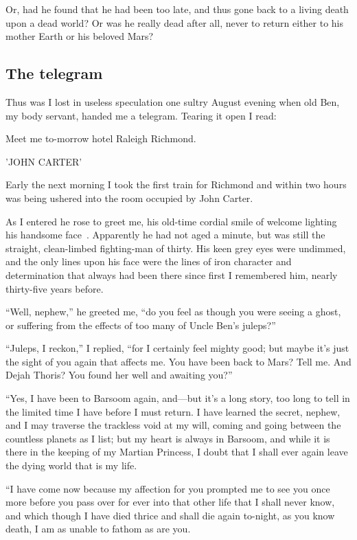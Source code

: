 \documentclass[11pt,a4paper,twocolumn]{article}
\begin{document}
Or, had he found that he had been too late, and thus gone back to a living
death upon a dead world?  Or was he really dead after all, never to return
either to his mother Earth or his beloved Mars?

\subsection{The telegram}

Thus was I lost in useless speculation one sultry August evening when old Ben,
my body servant, handed me a telegram.  Tearing it open I read:

\begin{center}
Meet me to-morrow hotel Raleigh Richmond.

'JOHN CARTER'
\end{center}

Early the next morning I took the first train for Richmond and within two hours
was being ushered into the room occupied by John Carter.

As I entered he rose to greet me, his old-time cordial smile of welcome
lighting his handsome face~\cite{Clarke2000}.  Apparently he had not aged a minute, but was still
the straight, clean-limbed fighting-man of thirty.  His keen grey eyes were
undimmed, and the only lines upon his face were the lines of iron character and
determination that always had been there since first I remembered him, nearly
thirty-five years before.

``Well, nephew,'' he greeted me, ``do you feel as though you were seeing a
ghost, or suffering from the effects of too many of Uncle Ben's juleps?''

``Juleps, I reckon,'' I replied, ``for I certainly feel mighty good; but maybe
it's just the sight of you again that affects me.  You have been back to Mars?
Tell me.  And Dejah Thoris?  You found her well and awaiting you?''

``Yes, I have been to Barsoom again, and---but it's a long story, too long to
tell in the limited time I have before I must return.  I have learned the
secret, nephew, and I may traverse the trackless void at my will, coming and
going between the countless planets as I list; but my heart is always in
Barsoom, and while it is there in the keeping of my Martian Princess, I doubt
that I shall ever again leave the dying world that is my life.

``I have come now because my affection for you prompted me to see you once more
before you pass over for ever into that other life that I shall never know, and
which though I have died thrice and shall die again to-night, as you know
death, I am as unable to fathom as are you.
\end{document}

